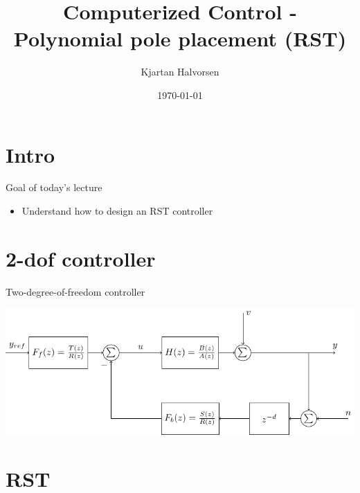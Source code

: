 \documentclass[presentation,aspectratio=169]{beamer}
\author{Kjartan Halvorsen}
\date{\today}
\title{Computerized Control - Polynomial pole placement (RST)}
\begin{document}
\maketitle


\section{Intro}
\label{sec-1}

\begin{frame}[label=sec-1-1]{Goal of today's lecture}
\begin{itemize}
\item Understand how to design an RST controller
\end{itemize}
\end{frame}

\section{2-dof controller}
\label{sec-2}

\begin{frame}[label=sec-2-1]{Two-degree-of-freedom controller}
\begin{center}
\includegraphics[width=0.8\linewidth]{../../figures/2dof-block-explicit}
\end{center}
\end{frame}

\section{RST}
\label{sec-3}
\end{document}
